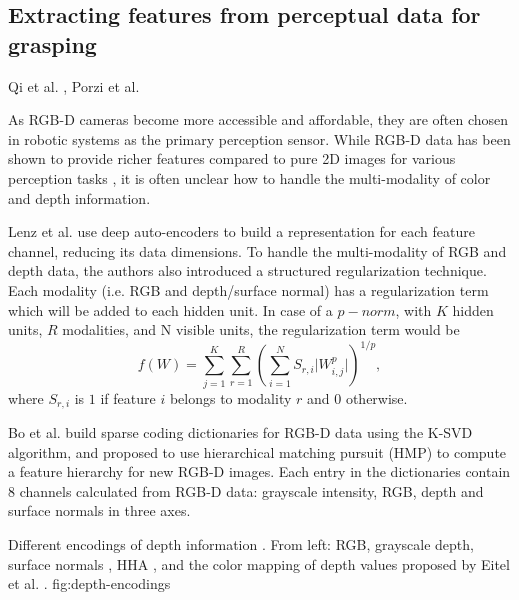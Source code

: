 \subsection{Extracting features from perceptual data for grasping}
Qi et al. \cite{Qi2016}, Porzi et al. \cite{Porzi2017} 

As RGB-D cameras become more accessible and affordable, they are often chosen in robotic systems as the primary
perception sensor. While RGB-D data has been shown to provide richer features compared to pure 2D images for various
perception tasks \cite{lenz2015,Eitel2015,Gupta2014RGBDFeatures,jiang2011}, it is often unclear how to handle the
multi-modality of color and depth information.

Lenz et al. \cite{lenz2015} use deep auto-encoders to build a representation for each feature channel, reducing its data
dimensions. To handle the multi-modality of RGB and depth data, the authors also introduced a structured regularization
technique. Each modality (i.e. RGB and depth/surface normal) has a regularization term which will be added to each
hidden unit. In case of a $p-norm$, with $K$ hidden units, $R$ modalities, and N visible units, the regularization term
would be
\[f(W) = \sum\limits^K_{j=1} \sum\limits^R_{r=1} \left( \sum\limits^N_{i=1} S_{r,i} \lvert W^p_{i,j} \rvert \right)
^{1/p}, \]
where $S_{r,i}$ is $1$ if feature $i$ belongs to modality $r$ and $0$ otherwise.

Bo et al. \cite{Bo2013} build sparse coding dictionaries for RGB-D data using the K-SVD algorithm, and proposed to use
hierarchical matching pursuit (HMP) to compute a feature hierarchy for new RGB-D images. Each entry in the dictionaries
contain 8 channels calculated from RGB-D data: grayscale intensity, RGB, depth and surface normals in three axes.

{Different encodings of depth information \cite{Eitel2015}. From left: RGB, grayscale depth, surface
    normals \cite{Bo2013}, HHA \cite{Gupta2014RGBDFeatures}, and the color mapping of depth values proposed
    by Eitel et al. \cite{Eitel2015}.}
{fig:depth-encodings}{\linewidth}

